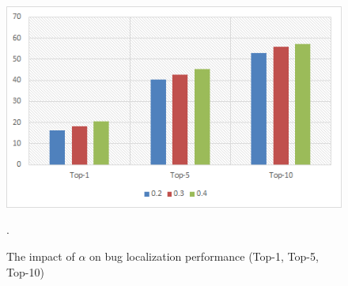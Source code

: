 \documentclass[conference]{IEEEtran}
\begin{document}
%			
\begin{figure}
	\centering
	\includegraphics[scale=0.80]{Performance-rvsm+simi+co}
	\caption{The impact of $\alpha$ on bug localization performance (Top-1, Top-5, Top-10)}.
	\label{fig:PerformanceTopK}
\end{figure}
\end{document}
